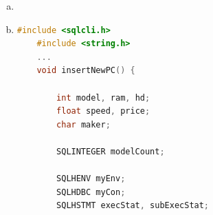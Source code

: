 \documentclass[12pt]{article}
\begin{document}
\begin{enumerate}[1.]
\begin{enumerate}[a)]
\begin{lstlisting}[language=c]
                    SQLBindCol(subExecStat, 1, SQL_FLOAT, &speed, sizeof(speed), &speedInfo);
                    SQLBindCol(subExecStat, 2, SQL_INTEGER, &ram, sizeof(ram), &ramInfo);
                    SQLBindCol(subExecStat, 3, SQL_INTEGER, &hd, sizeof(hd), &hdInfo);
                    SQLBindCol(subExecStat, 4, SQL_INTEGER, &screen, sizeof(screen), &screenInfo);
                    SQLBindCol(subExecStat, 5, SQL_FLOAT, &price, sizeof(price), &priceInfo);

                    while(SQLFetch(subExecStat) != SQL_NO_DATA) {
                        printf("model=%d, speed=%.2f, ram=%d, hd=%d, screen=%d, price=%.2f, maker=%c, type=%s",
                        model, speed, ram, hd, screen, screen, price, maker, productType);
                    }
                } else if (strcmp(productType, 'printer')) {
                    SQLPrepare(subExecStat,
                                "SELECT color, printType, price FROM Printer "
                                "NATURAL JOIN Product "
                                "WHERE type= ?", SQL_NTS);
                        SQLBindParameter(subExecStat, 1, ..., productType, ...);
                    SQLExecute(subExecStat);

                    SQLBindCol(subExecStat, 1, SQL_INTEGER, &color, sizeof(speed), &speedInfo);
                    SQLBindCol(subExecStat, 2, SQL_CHAR, &printType, sizeof(printType), &printTypeInfo);
                    SQLBindCol(subExecStat, 3, SQL_FLOAT, &price, sizeof(price), &priceInfo);

                    while(SQLFetch(subExecStat) != SQL_NO_DATA) {
                        printf("model=%d, color=%s, price=%.2f, maker=%c, type=%s",
                        model, color ? "true" : "false", price, maker, type);
                    }
                }
            }
        }
    }
    \end{lstlisting}

        \item
        \item

    \begin{lstlisting}[language=c]
    #include <sqlcli.h>
    #include <string.h>
    ...
    void insertNewPC() {

        int model, ram, hd;
        float speed, price;
        char maker;

        SQLINTEGER modelCount;

        SQLHENV myEnv;
        SQLHDBC myCon;
        SQLHSTMT execStat, subExecStat;


\end{lstlisting}
\end{enumerate}
\end{enumerate}
\end{document}
